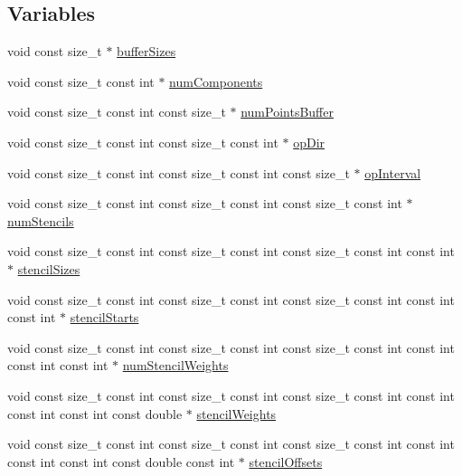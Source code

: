 \subsection*{Variables}
\begin{DoxyCompactItemize}
\item 
void const size\+\_\+t $\ast$ \hyperlink{OperatorKernels_8H_a302023d425dc22c2c647b4f9d8c78b0b}{buffer\+Sizes}
\item 
void const size\+\_\+t const int $\ast$ \hyperlink{OperatorKernels_8H_ad7e917240c44acf7de50a3cc9784e675}{num\+Components}
\item 
void const size\+\_\+t const int const size\+\_\+t $\ast$ \hyperlink{OperatorKernels_8H_aab9b71ed3bca7e28d7b21bee0d833084}{num\+Points\+Buffer}
\item 
void const size\+\_\+t const int const size\+\_\+t const int $\ast$ \hyperlink{OperatorKernels_8H_afc6f027cdb36bf6d86e573c2083e555b}{op\+Dir}
\item 
void const size\+\_\+t const int const size\+\_\+t const int const size\+\_\+t $\ast$ \hyperlink{OperatorKernels_8H_a136da8181293f91e3040a5e6126d2ef6}{op\+Interval}
\item 
void const size\+\_\+t const int const size\+\_\+t const int const size\+\_\+t const int $\ast$ \hyperlink{OperatorKernels_8H_a3ebb77d78da88e132f012ab6788ff123}{num\+Stencils}
\item 
void const size\+\_\+t const int const size\+\_\+t const int const size\+\_\+t const int const int $\ast$ \hyperlink{OperatorKernels_8H_ad36f7e6638c24dc8cce030ebb48e32a4}{stencil\+Sizes}
\item 
void const size\+\_\+t const int const size\+\_\+t const int const size\+\_\+t const int const int const int $\ast$ \hyperlink{OperatorKernels_8H_ab81c9b92fc99d6a20e08f1ad1c9630b0}{stencil\+Starts}
\item 
void const size\+\_\+t const int const size\+\_\+t const int const size\+\_\+t const int const int const int const int $\ast$ \hyperlink{OperatorKernels_8H_a728b4cc4b0d0125e2104144326d115da}{num\+Stencil\+Weights}
\item 
void const size\+\_\+t const int const size\+\_\+t const int const size\+\_\+t const int const int const int const int const double $\ast$ \hyperlink{OperatorKernels_8H_a71782584f6f521c3d69ed8a53fbbbd59}{stencil\+Weights}
\item 
void const size\+\_\+t const int const size\+\_\+t const int const size\+\_\+t const int const int const int const int const double const int $\ast$ \hyperlink{OperatorKernels_8H_aace4e878476c6638c99ce2be58848e52}{stencil\+Offsets}

\end{DoxyCompactItemize}
